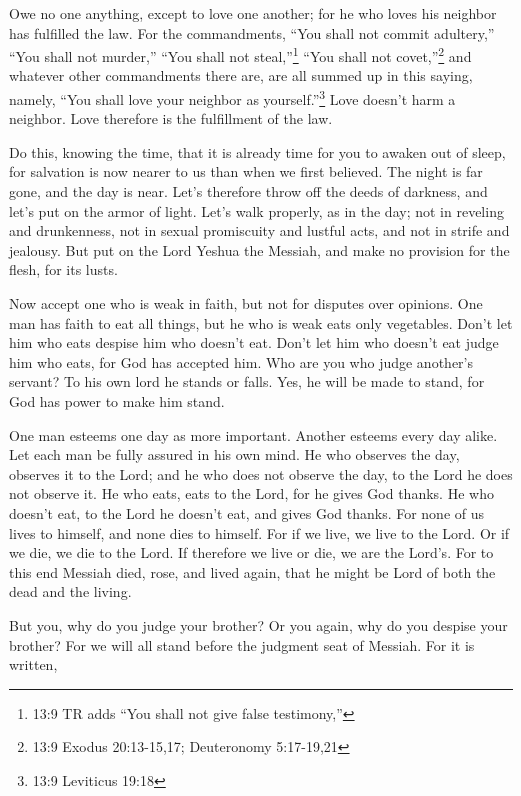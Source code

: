\myverse{}Owe no one anything, except to love one another; for he who loves
his neighbor has fulfilled the law.
\myverse{}For the commandments, “You shall not commit adultery,” “You shall not murder,”
“You shall not steal,”\footnote{13:9 TR adds “You shall not give false testimony,”} “You shall not covet,”\footnote{13:9 Exodus 20:13-15,17;
	Deuteronomy 5:17-19,21} and whatever other commandments there are, are
all summed up in this saying, namely, “You shall love your neighbor as yourself.”\footnote{13:9 Leviticus 19:18}
\myverse{}Love doesn’t harm a neighbor. Love therefore is the fulfillment of the law.

\myverse{}Do this, knowing the time, that it is already time for you to
awaken out of sleep, for salvation is now nearer to us than when we first believed.
\myverse{}The night is far gone, and the day is near. Let’s therefore throw off the
deeds of darkness, and let’s put on the armor of light.
\myverse{}Let’s walk properly, as in the day; not in reveling and drunkenness, not
in sexual promiscuity and lustful acts, and not in strife and jealousy.
\myverse{}But put on the Lord Yeshua the Messiah, and make no provision for the flesh,
for its lusts.


\mychapter{} \myverse*{}Now accept one who is weak in faith, but not for disputes over
opinions.
\myverse{}One man has faith to eat all things, but he who is weak eats only vegetables.
\myverse{}Don’t let him who eats despise him who doesn’t eat. Don’t let him who doesn’t
eat judge him who eats, for God has accepted him.
\myverse{}Who are you who judge another’s servant? To his own lord he stands or falls.
Yes, he will be made to stand, for God has power to make him stand.

\myverse{}One man esteems one day as more important. Another esteems every
day alike. Let each man be fully assured in his own mind.
\myverse{}He who observes the day, observes it to the Lord; and he who does not observe
the day, to the Lord he does not observe it. He who eats, eats to the Lord, for he gives God thanks. He
who doesn’t eat, to the Lord he doesn’t eat, and gives God thanks.
\myverse{}For none of us lives to himself, and none dies to himself.
\myverse{}For if we live, we live to the Lord. Or if we die, we die to the Lord. If therefore
we live or die, we are the Lord’s.
\myverse{}For to this end Messiah died, rose, and lived again, that he might be Lord
of both the dead and the living.

\myverse{}But you, why do you judge your brother? Or you again, why do
you despise your brother? For we will all stand before the judgment seat of Messiah.
\myverse{}For it is written,

